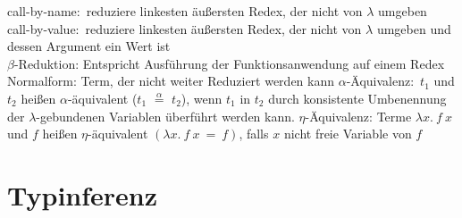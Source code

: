 \documentclass{article}
\begin{document}
\noindent
call-by-name:~reduziere linkesten äußersten Redex, der nicht von $\lambda$ umgeben\\
call-by-value:~reduziere linkesten äußersten Redex, der nicht von $\lambda$ umgeben und dessen Argument ein Wert ist\\
$\beta$-Reduktion: Entspricht Ausführung der Funktionsanwendung auf einem Redex\newline
Normalform: Term, der nicht weiter Reduziert werden kann\newline
$\alpha$-Äquivalenz:~$t_1$ und $t_2$ heißen $\alpha$-äquivalent ($t_1$ $\stackrel{\alpha}{=}$ $t_2$), wenn $t_1$ in $t_2$ durch konsistente Umbenennung der $\lambda$-gebundenen Variablen überführt werden kann.\newline
$\eta$-Äquivalenz: Terme $\lambda x.~f~x$ und $f$ heißen $\eta$-äquivalent $(\lambda x.~f~x~=~f)$, falls $x$ nicht freie Variable von $f$\newline

\vspace{3em}


\section{Typinferenz}

{\Large
\begin{multicols}{2}

\begin{prooftree}
\end{prooftree}

\begin{prooftree}
\end{prooftree}

\end{multicols}

\begin{multicols}{2}

\begin{prooftree}
\end{prooftree}

\begin{prooftree}
\end{prooftree}

\end{multicols}

\begin{prooftree}
\end{prooftree}
}
\end{document}
